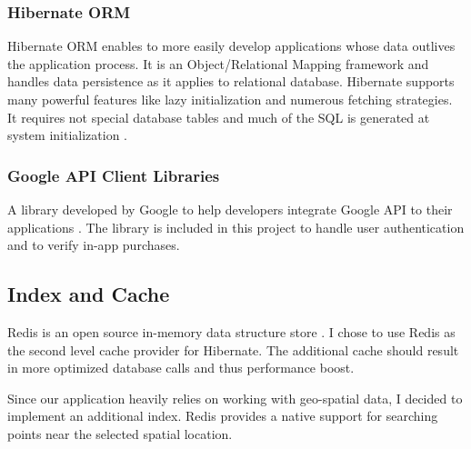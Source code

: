 		\subsubsection{Hibernate ORM}
		Hibernate ORM enables to more easily develop applications whose data outlives the application process. It is an Object/Relational Mapping framework and handles data persistence as it applies to relational database. Hibernate supports many powerful features like lazy initialization and numerous fetching strategies. It requires not special database tables and much of the SQL is generated at system initialization \cite{hibernate}.
		
		\subsubsection{Google API Client Libraries}
		A library developed by Google to help developers integrate Google API to their applications \cite{googleapilibs}. The library is included in this project to handle user authentication and to verify in-app purchases.
		
	\subsection{Index and Cache}
	Redis is an open source in-memory data structure store \cite{redis}. I chose to use Redis as the second level cache provider for Hibernate. The additional cache should result in more optimized database calls and thus performance boost.
	
	Since our application heavily relies on working with geo-spatial data, I decided to implement an additional index. Redis provides a native support for searching points near the selected spatial location.
	
	
		
	